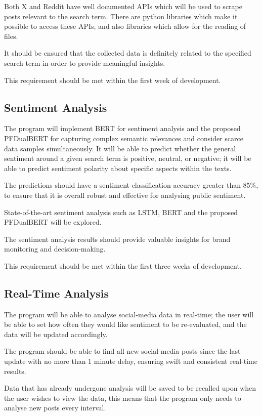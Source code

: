     Both X and Reddit have well documented APIs which will be used to scrape posts relevant to the search term. There are python libraries which make it possible to access these APIs, and also libraries which allow for the reading of  files.

    It should be ensured that the collected data is definitely related to the specified search term in order to provide meaningful insights.

    This requirement should be met within the first week of development.

    \subsection{Sentiment Analysis}
    The program will implement BERT for sentiment analysis and the proposed PFDualBERT for capturing complex semantic relevances and consider scarce data samples simultaneously. It will be able to predict whether the general sentiment around a given search term is positive, neutral, or negative; it will be able to predict sentiment polarity about specific aspects within the texts.

    The predictions should have a sentiment classification accuracy greater than 85\%, to ensure that it is overall robust and effective for analysing public sentiment.

    State-of-the-art sentiment analysis such as LSTM, BERT and the proposed PFDualBERT will be explored.

    The sentiment analysis results should provide valuable insights for brand monitoring and decision-making.

    This requirement should be met within the first three weeks of development.

    \subsection{Real-Time Analysis}
    The program will be able to analyse social-media data in real-time; the user will be able to set how often they would like sentiment to be re-evaluated, and the data will be updated accordingly.

    The program should be able to find all new social-media posts since the last update with no more than 1 minute delay, ensuring swift and consistent real-time results.

    Data that has already undergone analysis will be saved to be recalled upon when the user wishes to view the data, this means that the program only needs to analyse new posts every interval.

